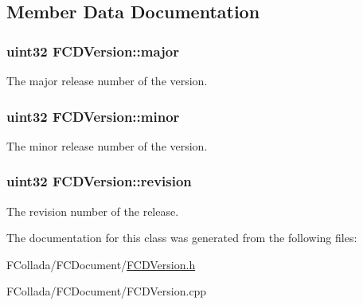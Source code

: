 \subsection{Member Data Documentation}
\hypertarget{classFCDVersion_ad2508c7e5740ba8f03a0afe18bb9c7b5}{
\subsubsection[{major}]{\setlength{\rightskip}{0pt plus 5cm}uint32 {\bf FCDVersion::major}}}
\label{classFCDVersion_ad2508c7e5740ba8f03a0afe18bb9c7b5}
The major release number of the version. \hypertarget{classFCDVersion_a7fa0db1f60be770ccff8ff93c3e11deb}{
\subsubsection[{minor}]{\setlength{\rightskip}{0pt plus 5cm}uint32 {\bf FCDVersion::minor}}}
\label{classFCDVersion_a7fa0db1f60be770ccff8ff93c3e11deb}
The minor release number of the version. \hypertarget{classFCDVersion_a24a8596d2fa8ebfbb5866abb7be4801c}{
\subsubsection[{revision}]{\setlength{\rightskip}{0pt plus 5cm}uint32 {\bf FCDVersion::revision}}}
\label{classFCDVersion_a24a8596d2fa8ebfbb5866abb7be4801c}
The revision number of the release. 

The documentation for this class was generated from the following files:\begin{DoxyCompactItemize}
\item 
FCollada/FCDocument/\hyperlink{FCDVersion_8h}{FCDVersion.h}\item 
FCollada/FCDocument/FCDVersion.cpp\end{DoxyCompactItemize}
